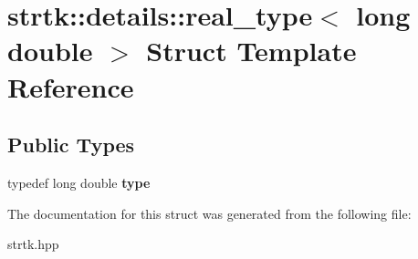 \hypertarget{structstrtk_1_1details_1_1real__type_3_01long_01double_01_4}{\section{strtk\-:\-:details\-:\-:real\-\_\-type$<$ long double $>$ Struct Template Reference}
\label{structstrtk_1_1details_1_1real__type_3_01long_01double_01_4}
}
\subsection*{Public Types}
\begin{DoxyCompactItemize}
\item 
\hypertarget{structstrtk_1_1details_1_1real__type_3_01long_01double_01_4_a48ff0d17fae2b2d58e5968f76d2fbdb3}{typedef long double {\bfseries type}}\label{structstrtk_1_1details_1_1real__type_3_01long_01double_01_4_a48ff0d17fae2b2d58e5968f76d2fbdb3}

\end{DoxyCompactItemize}


The documentation for this struct was generated from the following file\-:\begin{DoxyCompactItemize}
\item 
strtk.\-hpp\end{DoxyCompactItemize}
